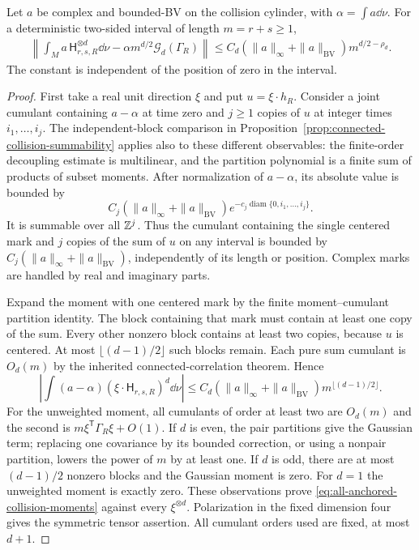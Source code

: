 \begin{lemma}
\label{lem:all-anchored-collision-moments}
Let $a$ be complex and bounded-BV on the collision cylinder, with
$\alpha=\int a\dd\nu$. For a deterministic two-sided interval of
length $m=r+s\ge1$,
\begin{align}
 \left\|\int_M a\,\mathsf H_{r,s,R}^{\otimes d}\dd\nu
                  -\alpha m^{d/2}\mathcal G_d(\Gamma_R)\right\|
 \le C_d(\|a\|_\infty+\|a\|_{\mathrm{BV}})m^{d/2-\rho_d}.
 \label{eq:all-anchored-collision-moments}
\end{align}
The constant is independent of the position of zero in the interval.
\end{lemma}
\begin{proof}
First take a real unit direction $\xi$ and put $u=\xi\cdot h_R$.
Consider a joint cumulant containing $a-\alpha$ at time zero and
$j\ge1$ copies of $u$ at integer times $i_1,\ldots,i_j$.
The independent-block comparison in
Proposition~\ref{prop:connected-collision-summability} applies also
to these different observables: the finite-order decoupling estimate
is multilinear, and the partition polynomial is a finite sum of
products of subset moments. After normalization of $a-\alpha$, its
absolute value is bounded by
\[
 C_j(\|a\|_\infty+\|a\|_{\mathrm{BV}})
    e^{-c_j\operatorname{diam}\{0,i_1,\ldots,i_j\}}.
\]
It is summable over all $\mathbb Z^j$. Thus the cumulant containing the
single centered mark and $j$ copies of the sum of $u$ on any interval
is bounded by $C_j(\|a\|_\infty+\|a\|_{\mathrm{BV}})$, independently
of its length or position. Complex marks are handled by real and
imaginary parts.

Expand the moment with one centered mark by the finite
moment--cumulant partition identity. The block containing that mark
must contain at least one copy of the sum. Every other nonzero block
contains at least two copies, because $u$ is centered. At most
$\lfloor(d-1)/2\rfloor$ such blocks remain. Each pure sum cumulant
is $O_d(m)$ by the inherited connected-correlation theorem. Hence
\[
 \left|\int(a-\alpha)(\xi\cdot\mathsf H_{r,s,R})^d\dd\nu\right|
 \le C_d(\|a\|_\infty+\|a\|_{\mathrm{BV}})
                         m^{\lfloor(d-1)/2\rfloor}.
\]
For the unweighted moment, all cumulants of order at least two are
$O_d(m)$ and the second is $m\xi^{\mathsf T}\Gamma_R\xi+O(1)$.
If $d$ is even, the pair partitions give the Gaussian term; replacing
one covariance by its bounded correction, or using a nonpair
partition, lowers the power of $m$ by at least one. If $d$ is odd,
there are at most $(d-1)/2$ nonzero blocks and the Gaussian moment
is zero. For $d=1$ the unweighted moment is exactly zero.
These observations prove \eqref{eq:all-anchored-collision-moments}
against every $\xi^{\otimes d}$. Polarization in the fixed dimension
four gives the symmetric tensor assertion. All cumulant orders used
are fixed, at most $d+1$.
\end{proof}

